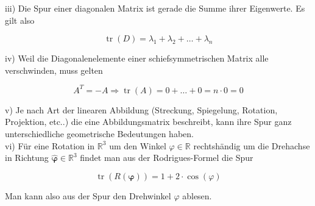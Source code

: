 \documentclass[10pt]{article}
\begin{document}
iii) Die Spur einer diagonalen Matrix ist gerade die Summe ihrer Eigenwerte. Es gilt also


\begin{equation*}
\operatorname{tr}(D)=\lambda_{1}+\lambda_{2}+\ldots+\lambda_{n} \tag{6.92}
\end{equation*}


iv) Weil die Diagonalenelemente einer schiefsymmetrischen Matrix alle verschwinden, muss gelten


\begin{equation*}
A^{T}=-A \Rightarrow \operatorname{tr}(A)=0+\ldots+0=n \cdot 0=0 \tag{6.93}
\end{equation*}


v) Je nach Art der linearen Abbildung (Streckung, Spiegelung, Rotation, Projektion, etc..) die eine Abbildungsmatrix beschreibt, kann ihre Spur ganz unterschiedliche geometrische Bedeutungen haben.\\
vi) Für eine Rotation in $\mathbb{R}^{3}$ um den Winkel $\varphi \in \mathbb{R}$ rechtshändig um die Drehachse in Richtung $\hat{\boldsymbol{\varphi}} \in \mathbb{R}^{3}$ findet man aus der Rodrigues-Formel die Spur


\begin{equation*}
\operatorname{tr}(R(\boldsymbol{\varphi}))=1+2 \cdot \cos (\varphi) \tag{6.94}
\end{equation*}


Man kann also aus der Spur den Drehwinkel $\varphi$ ablesen.
\end{document}
